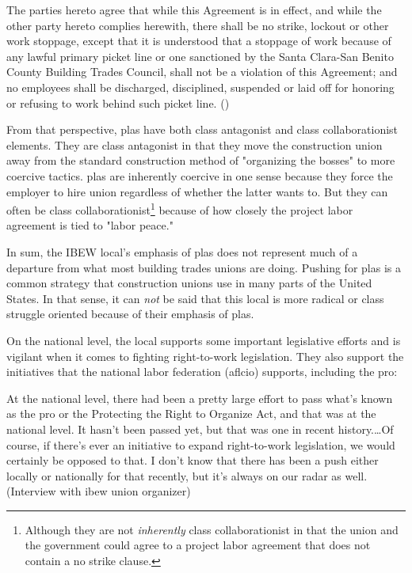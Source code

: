 \documentclass[12pt]{article}
\renewenvironment{quote}
  {\list{}{\leftmargin=\parindent\rightmargin=0pt}%
   \item\relax}
  {\endlist}
\begin{document}
\begin{quote}
The parties hereto agree that while this Agreement is in effect, and while the other party hereto complies herewith, there shall be no strike, lockout or other work stoppage, except that it is understood that a stoppage of work because of any lawful primary picket line or one sanctioned by the Santa Clara-San Benito County Building Trades Council, shall not be a violation of this Agreement; and no employees shall be discharged, disciplined, suspended or laid off for honoring or refusing to work behind such picket line. (\cite[50]{ualocalunion393MasterLaborAgreement2018})
\end{quote}

From that perspective, \acrshort{pla}s have both class antagonist and class collaborationist elements. They are class antagonist in that they move the construction union away from the standard construction method of "organizing the bosses" to more coercive tactics. \acrshort{pla}s are inherently coercive in one sense because they force the employer to hire union regardless of whether the latter wants to. But they can often be class collaborationist\footnote{Although they are not \emph{inherently} class collaborationist in that the union and the government could agree to a project labor agreement that does not contain a no strike clause.} because of how closely the project labor agreement is tied to "labor peace."

In sum, the IBEW local's emphasis of \acrshort{pla}s does not represent much of a departure from what most building trades unions are doing. Pushing for \acrshort{pla}s is a common strategy that construction unions use in many parts of the United States. In that sense, it can \textit{not} be said that this local is more radical or class struggle oriented because of their emphasis of \acrshort{pla}s.

On the national level, the local supports some important legislative efforts and is vigilant when it comes to fighting right-to-work legislation. They also support the initiatives that the national labor federation (\acrshort{aflcio}) supports, including the \acrshort{pro}:

\begin{quote}
At the national level, there had been a pretty large effort to pass what's known as the \acrshort{pro} or the Protecting the Right to Organize Act, and that was at the national level. It hasn't been passed yet, but that was one in recent history.\ldots{}Of course, if there's ever an initiative to expand right-to-work legislation, we would certainly be opposed to that. I don't know that there has been a push either locally or nationally for that recently, but it’s always on our radar as well. (Interview with \acrshort{ibew} union organizer)
\end{quote}
\end{document}
